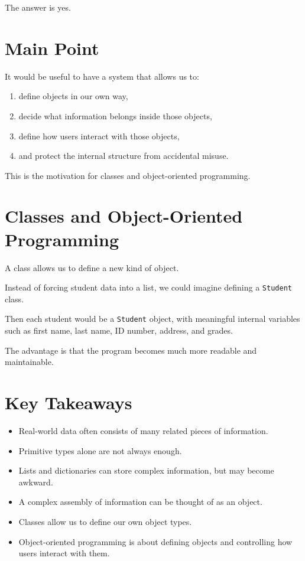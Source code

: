 \documentclass[11pt]{article}
\begin{document}
The answer is yes.

\section{Main Point}

It would be useful to have a system that allows us to:

\begin{enumerate}
    \item define objects in our own way,
    \item decide what information belongs inside those objects,
    \item define how users interact with those objects,
    \item and protect the internal structure from accidental misuse.
\end{enumerate}

This is the motivation for classes and object-oriented programming.

\section{Classes and Object-Oriented Programming}

A class allows us to define a new kind of object.

Instead of forcing student data into a list, we could imagine defining a \verb|Student| class.

Then each student would be a \verb|Student| object, with meaningful internal variables such as first name, last name, ID number, address, and grades.

The advantage is that the program becomes much more readable and maintainable.

\section{Key Takeaways}

\begin{itemize}
    \item Real-world data often consists of many related pieces of information.
    \item Primitive types alone are not always enough.
    \item Lists and dictionaries can store complex information, but may become awkward.
    \item A complex assembly of information can be thought of as an object.
    \item Classes allow us to define our own object types.
    \item Object-oriented programming is about defining objects and controlling how users interact with them.
\end{itemize}
\end{document}

